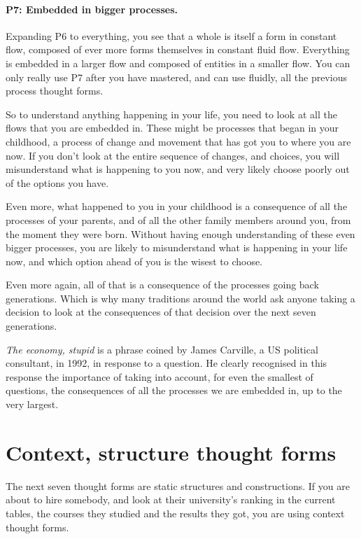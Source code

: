 \paragraph{\textbf{P7: Embedded in bigger processes.}}
Expanding P6 to everything, you see that a whole is itself a form in constant flow, composed of ever more forms themselves in constant fluid flow. Everything is embedded in a larger flow and composed of entities in a smaller flow. You can only really use P7 after you have mastered, and can use fluidly, all the previous process thought forms.


So to understand anything happening in your life, you need to look at all the flows that you are embedded in. These might be processes that began in your childhood, a process of change and movement that has got you to where you are now. If you don't look at the entire sequence of changes, and choices, you will misunderstand what is happening to you now, and very likely choose poorly out of the options you have.


Even more, what happened to you in your childhood is a consequence of all the processes of your parents, and of all the other family members around you, from the moment they were born. Without having enough understanding of these even bigger processes, you are likely to misunderstand what is happening in your life now, and which option ahead of you is the wisest to choose.


Even more again, all of that is a consequence of the processes going back generations. Which is why many traditions around the world ask anyone taking a decision to look at the consequences of that decision over the next seven generations.


\emph{The economy, stupid} is a phrase coined by James Carville, a US political consultant, in 1992, in response to a question. He clearly recognised in this response the importance of taking into account, for even the smallest of questions, the consequences of all the processes we are embedded in, up to the very largest.




\section{Context, structure thought forms}
The next seven thought forms are static structures and constructions. If you are about to hire somebody, and look at their university's ranking in the current tables, the courses they studied and the results they got, you are using context thought forms.


